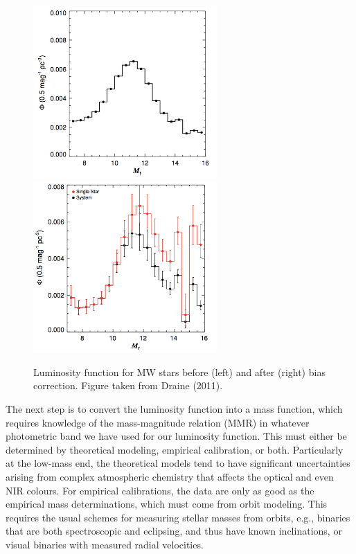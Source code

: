 \documentclass[a4paper,10pt]{article}
\begin{document}
\begin{figure}[h!]
    \centering
    \includegraphics[width=7cm]{figures/lumfunc_before.png} \includegraphics[width=7cm]{figures/lumfunc_after.png}
    \caption{\footnotesize{Luminosity function for MW stars before (left) and after (right) bias correction. Figure taken from Draine (2011).}}
    \label{fig:lumfunc}
\end{figure}

{\noindent}The next step is to convert the luminosity function into a mass function, which requires knowledge of the mass-magnitude relation (MMR) in whatever photometric band we have used for our luminosity function. This must either be determined by theoretical modeling, empirical calibration, or both. Particularly at the low-mass end, the theoretical models tend to have significant uncertainties arising from complex atmospheric chemistry that affects the optical and even NIR colours. For empirical calibrations, the data are only as good as the empirical mass determinations, which must come from orbit modeling. This requires the usual schemes for measuring stellar masses from orbits, e.g., binaries that are both spectroscopic and eclipsing, and thus have known inclinations, or visual binaries with measured radial velocities. 
\end{document}
